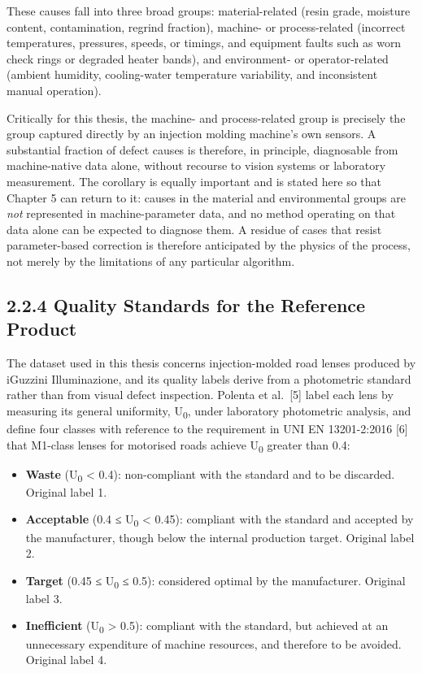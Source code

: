 These causes fall into three broad groups: material-related (resin grade, moisture content, contamination, regrind fraction), machine- or process-related (incorrect temperatures, pressures, speeds, or timings, and equipment faults such as worn check rings or degraded heater bands), and environment- or operator-related (ambient humidity, cooling-water temperature variability, and inconsistent manual operation).

Critically for this thesis, the machine- and process-related group is precisely the group captured directly by an injection molding machine's own sensors. A substantial fraction of defect causes is therefore, in principle, diagnosable from machine-native data alone, without recourse to vision systems or laboratory measurement. The corollary is equally important and is stated here so that Chapter 5 can return to it: causes in the material and environmental groups are \emph{not} represented in machine-parameter data, and no method operating on that data alone can be expected to diagnose them. A residue of cases that resist parameter-based correction is therefore anticipated by the physics of the process, not merely by the limitations of any particular algorithm.

\hypertarget{quality-standards-for-the-reference-product}{%
\subsection{2.2.4 Quality Standards for the Reference Product}\label{quality-standards-for-the-reference-product}}

The dataset used in this thesis concerns injection-molded road lenses produced by iGuzzini Illuminazione, and its quality labels derive from a photometric standard rather than from visual defect inspection. Polenta et al.~{[}5{]} label each lens by measuring its general uniformity, U\textsubscript{0}, under laboratory photometric analysis, and define four classes with reference to the requirement in UNI EN 13201-2:2016 {[}6{]} that M1-class lenses for motorised roads achieve U\textsubscript{0} greater than 0.4:

\begin{itemize}
\tightlist
\item
  \textbf{Waste} (U\textsubscript{0} \textless{} 0.4): non-compliant with the standard and to be discarded. Original label 1.
\item
  \textbf{Acceptable} (0.4 ≤ U\textsubscript{0} \textless{} 0.45): compliant with the standard and accepted by the manufacturer, though below the internal production target. Original label 2.
\item
  \textbf{Target} (0.45 ≤ U\textsubscript{0} ≤ 0.5): considered optimal by the manufacturer. Original label 3.
\item
  \textbf{Inefficient} (U\textsubscript{0} \textgreater{} 0.5): compliant with the standard, but achieved at an unnecessary expenditure of machine resources, and therefore to be avoided. Original label 4.
\end{itemize}

